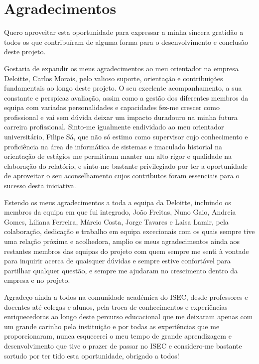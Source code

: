 \section{Agradecimentos}\label{sec:agradecimentos}

    Quero aproveitar esta oportunidade para expressar a minha sincera gratidão a todos os que contribuíram de alguma forma para o desenvolvimento e conclusão deste projeto.

    Gostaria de expandir os meus agradecimentos ao meu orientador na empresa Deloitte, Carlos Morais, pelo valioso suporte, orientação e contribuições fundamentais ao longo deste projeto. O seu excelente acompanhamento, a sua constante e perspicaz avaliação, assim como a gestão dos diferentes membros da equipa com variadas personalidades e capacidades fez-me crescer como profissional e vai sem dúvida deixar um impacto duradouro na minha futura carreira profissional. \newline
    Sinto-me igualmente endividado ao meu orientador universitário, Filipe Sá, que não só estimo como supervisor cujo conhecimento e proficiência na área de informática de sistemas e imaculado historial na orientação de estágios me permitiram manter um alto rigor e qualidade na elaboração do relatório, e sinto-me bastante privilegiado por ter a oportunidade de aproveitar o seu aconselhamento cujos contributos foram essenciais para o sucesso desta iniciativa.

    Estendo os meus agradecimentos a toda a equipa da Deloitte, incluindo os membros da equipa em que fui integrado, João Freitas, Nuno Gaio, Andreia Gomes, Liliana Ferreira, Márcio Costa, Jorge Tavares e Laisa Lamir, pela colaboração, dedicação e trabalho em equipa excecionais com os quais sempre tive uma relação próxima e acolhedora, amplio os meus agradecimentos ainda aos restantes membros das equipas do projeto com quem sempre me senti à vontade para inquirir acerca de quaisquer dúvidas e sempre estive confortável para partilhar qualquer questão, e sempre me ajudaram no crescimento dentro da empresa e no projeto.

    Agradeço ainda a todos na comunidade académica do ISEC, desde professores e docentes até colegas e alunos, pela troca de conhecimentos e experiências enriquecedoras ao longo deste percurso educacional que me deixaram apenas com um grande carinho pela instituição e por todas as experiências que me proporcionaram, nunca esquecerei o meu tempo de grande aprendizagem e desenvolvimento que tive o prazer de passar no ISEC e considero-me bastante sortudo por ter tido esta oportunidade, obrigado a todos!